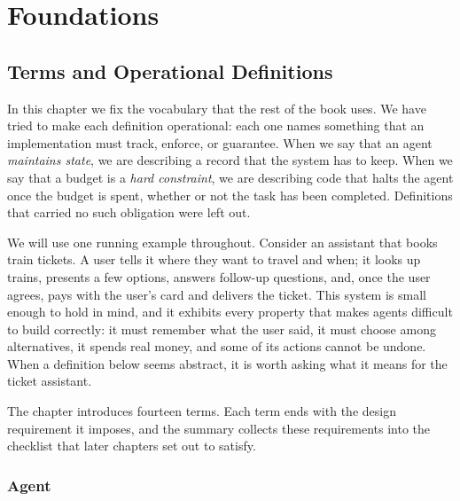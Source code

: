 \documentclass[11pt]{book}
\begin{document}
\tableofcontents

\mainmatter
\part{Foundations}

\chapter{Terms and Operational Definitions}
\label{ch:terms}

In this chapter we fix the vocabulary that the rest of the book uses. We have tried to make each definition operational: each one names something that an implementation must track, enforce, or guarantee. When we say that an agent \textit{maintains state}, we are describing a record that the system has to keep. When we say that a budget is a \textit{hard constraint}, we are describing code that halts the agent once the budget is spent, whether or not the task has been completed. Definitions that carried no such obligation were left out.

We will use one running example throughout. Consider an assistant that books train tickets. A user tells it where they want to travel and when; it looks up trains, presents a few options, answers follow-up questions, and, once the user agrees, pays with the user's card and delivers the ticket. This system is small enough to hold in mind, and it exhibits every property that makes agents difficult to build correctly: it must remember what the user said, it must choose among alternatives, it spends real money, and some of its actions cannot be undone. When a definition below seems abstract, it is worth asking what it means for the ticket assistant.

The chapter introduces fourteen terms. Each term ends with the design requirement it imposes, and the summary collects these requirements into the checklist that later chapters set out to satisfy.

\section{Agent}
\end{document}
